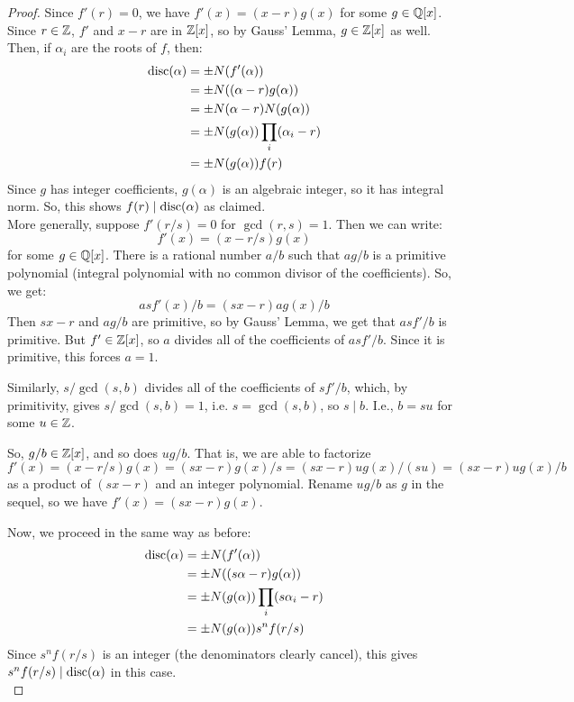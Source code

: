 \begin{proof} 
    Since $f'(r) = 0$, we have $f'(x) = (x-r)g(x)$ for some $g \in \mathbb{Q}[x]$. Since $r \in \mathbb{Z}$, $f'$ and $x-r$ are in $\mathbb{Z}[x]$, so by Gauss' Lemma, $g \in \mathbb{Z}[x]$ as well. Then, if $\alpha_i$ are the roots of $f$, then:
    \begin{align*}
    \operatorname{disc}(\alpha)
        &= \pm N(f'(\alpha)) \\
        &= \pm N((\alpha-r)g(\alpha)) \\
        &= \pm N(\alpha-r)N(g(\alpha)) \\
        &= \pm N(g(\alpha))\prod_i (\alpha_i-r) \\
        &= \pm N(g(\alpha))f(r)
    \end{align*}
    Since $g$ has integer coefficients, $g(\alpha)$ is an algebraic integer, so it has integral norm. So, this shows $f(r) \mid \operatorname{disc}(\alpha)$ as claimed. \\

    More generally, suppose $f'(r/s) = 0$ for $\gcd(r,s)=1$. Then we can write:
    \[ f'(x) = (x-r/s)g(x) \]
    for some $g \in \mathbb{Q}[x]$. There is a rational number $a/b$ such that $ag/b$ is a primitive polynomial (integral polynomial with no common divisor of the coefficients). So, we get:
    \[ asf'(x)/b = (sx-r)ag(x)/b \]
    Then $sx-r$ and $ag/b$ are primitive, so by Gauss' Lemma, we get that $asf'/b$ is primitive. But $f' \in \mathbb{Z}[x]$, so $a$ divides all of the coefficients of $asf'/b$. Since it is primitive, this forces $a=1$.

    Similarly, $s/\gcd(s,b)$ divides all of the coefficients of $sf'/b$, which, by primitivity, gives $s/\gcd(s,b) = 1$, i.e. $s = \gcd(s,b)$, so $s \mid b$. I.e., $b = su$ for some $u \in \mathbb{Z}$.
    
    So, $g/b \in \mathbb{Z}[x]$, and so does $ug/b$. That is, we are able to factorize
    \[ f'(x) = (x-r/s)g(x) = (sx-r)g(x)/s = (sx-r)ug(x)/(su) = (sx-r)ug(x)/b \]
    as a product of $(sx-r)$ and an integer polynomial. Rename $ug/b$ as $g$ in the sequel, so we have $f'(x) = (sx-r)g(x)$.

    Now, we proceed in the same way as before:
    \begin{align*}
    \operatorname{disc}(\alpha)
        &= \pm N(f'(\alpha)) \\
        &= \pm N((s\alpha-r)g(\alpha)) \\
        &= \pm N(g(\alpha))\prod_i (s\alpha_i-r) \\
        &= \pm N(g(\alpha))s^nf(r/s)
    \end{align*}
    Since $s^nf(r/s)$ is an integer (the denominators clearly cancel), this gives $s^nf(r/s) \mid \operatorname{disc}(\alpha)$ in this case. \\


\end{proof}
